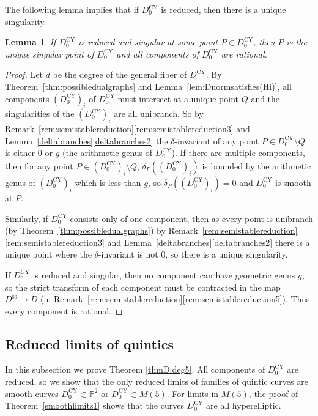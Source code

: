 \documentclass[JEP,XML,SOM,Unicode,NoFloatCountersInSection,published]{cedram}
\theoremstyle{plain}
\newtheorem{lemma}[theorem]{Lemma}
\theoremstyle{definition}
\newcommand\PP{{\mathbb{P}}}
\newcommand\Dcy{{D^{\mathrm{CY}}}}
\newcommand\Dss{{D^{\mathrm{ss}}}}
\newcommand\Dcyo{{D^{\mathrm{CY}}_0}}
\begin{document}
The following lemma implies that if $\Dcyo$ is reduced, then there is a unique singularity.

\begin{lemma}\label{lem:uniquesingularpt}
If $\Dcyo$ is reduced and singular at some point $P \in \Dcyo$, then $P$ is the unique singular point of $\Dcyo$ and all components of $\Dcyo$ are rational.
\end{lemma}

\begin{proof}
Let $d$ be the degree of the general fiber of $\Dcy$. By Theorem~\ref{thm:possibledualgraphs} and Lemma~\ref{lem:Dnormsatisfies(Hi)}, all components $(\Dcyo)_i$ of $\Dcyo$ must intersect at a unique point $Q$ and the singularities of the $(\Dcyo)_i$ are all unibranch. So by Remark~\ref{rem:semistablereduction}\eqref{rem:semistablereduction3} and Lemma~\ref{deltabranches}\eqref{deltabranches2} the $\delta$-invariant of any point $P\in \Dcyo\setminus Q$ is either $0$ or $g$ (the arithmetic genus of $\Dcyo$). If there are multiple components, then for any point $P \in (\Dcyo)_i\setminus Q$, $\delta_P((\Dcyo)_i)$ is bounded by the arithmetic genus of $(\Dcyo)_i$ which is less than $g$, so $\delta_P((\Dcyo)_i)=0$ and $\Dcyo$ is smooth at $P$.

Similarly, if $\Dcyo$ consists only of one component, then as every point is unibranch (by Theorem~\ref{thm:possibledualgraphs}) by Remark~\ref{rem:semistablereduction}\eqref{rem:semistablereduction3} and Lemma~\ref{deltabranches}\eqref{deltabranches2} there is a unique point where the $\delta$-invariant is not 0, so there is a unique singularity.

If $\Dcyo$ is reduced and singular, then no component can have geometric genus $g$, so the strict transform of each component must be contracted in the map $\Dss\to D$ (in Remark~\ref{rem:semistablereduction}\eqref{rem:semistablereduction5}). Thus every component is rational.
\end{proof}

\subsection{Reduced limits of quintics}
In this subsection we prove Theorem \ref{thmD:deg5}. All components of $\Dcyo$ are reduced, so we show that the only reduced limits of families of quintic curves are smooth curves $\Dcyo \subset \PP^2$ or $\Dcyo \subset M(5)$. For limits in $M(5)$, the proof of Theorem~\ref{smoothlimits1} shows that the curves $\Dcyo$ are all hyperelliptic.
\end{document}
